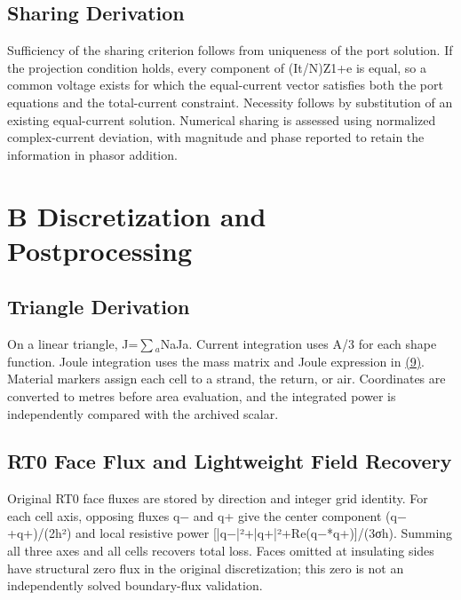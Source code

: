 \documentclass[journal,10pt]{IEEEtran}
\begin{document}
\subsection*{Sharing Derivation}
\hypertarget{A.sharing_derivation.heading}{}
Sufficiency of the sharing criterion follows from uniqueness of the port solution. If the projection condition holds, every component of (It/N)Z1+e is equal, so a common voltage exists for which the equal-current vector satisfies both the port equations and the total-current constraint. Necessity follows by substitution of an existing equal-current solution. Numerical sharing is assessed using normalized complex-current deviation, with magnitude and phase reported to retain the information in phasor addition.


\FloatBarrier
\section*{B Discretization and Postprocessing}
\hypertarget{chapter-B}{}
\subsection*{Triangle Derivation}
\hypertarget{B.triangle_derivation.heading}{}
On a linear triangle, J=\(\sum\)\(_a\)NaJa. Current integration uses A/3 for each shape function. Joule integration uses the mass matrix and Joule expression in \href{report_en_ieee.pdf#E09}{(9)}. Material markers assign each cell to a strand, the return, or air. Coordinates are converted to metres before area evaluation, and the integrated power is independently compared with the archived scalar.


\subsection*{RT0 Face Flux and Lightweight Field Recovery}
\hypertarget{B.report_rt0.heading}{}
Original RT0 face fluxes are stored by direction and integer grid identity. For each cell axis, opposing fluxes q− and q+ give the center component (q−+q+)/(2h²) and local resistive power [|q−|²+|q+|²+Re(q−*q+)]/(3σh). Summing all three axes and all cells recovers total loss. Faces omitted at insulating sides have structural zero flux in the original discretization; this zero is not an independently solved boundary-flux validation.
\end{document}
